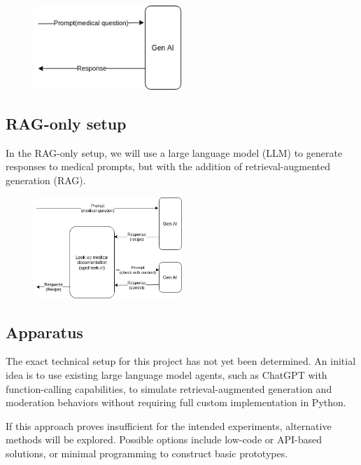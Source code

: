 \begin{figure}
    \includegraphics[width=0.5\textwidth]{figures/baselineSetup.png}
    \label{fig:baselineSetup}
\end{figure}

\subsection{RAG-only setup}

In the RAG-only setup, we will use a large language model (LLM) to generate responses to medical prompts, but with the addition of retrieval-augmented generation (RAG).

\begin{figure}
    \includegraphics[width=0.5\textwidth]{figures/RAGSetup.png}
    \label{fig:ragSetup}
\end{figure}

\subsection{Apparatus}

The exact technical setup for this project has not yet been determined. An initial idea is to use existing large language model agents, such as ChatGPT with function-calling capabilities, to simulate retrieval-augmented generation and moderation behaviors without requiring full custom implementation in Python.

If this approach proves insufficient for the intended experiments, alternative methods will be explored. Possible options include low-code or API-based solutions, or minimal programming to construct basic prototypes.

